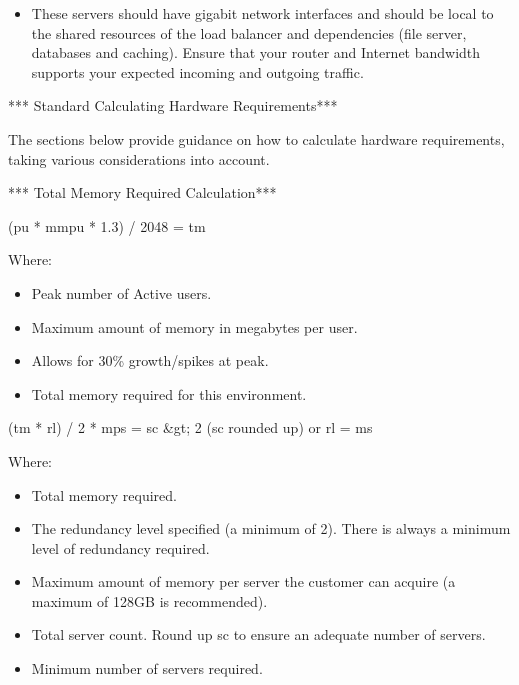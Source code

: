 \documentclass[letterpaper,10pt,english]{sphinxmanual}
\begin{document}
\begin{itemize}
\item {} 
These servers should have gigabit network interfaces and should be local to the shared resources of the load balancer and dependencies (file server, databases and caching). Ensure that your router and Internet bandwidth supports your expected incoming and outgoing traffic.

\end{itemize}

*** Standard Calculating Hardware Requirements***

The sections below provide guidance on how to calculate hardware requirements, taking various considerations into account.

*** Total Memory Required Calculation***

(pu * mmpu * 1.3) / 2048 = tm

Where:
\begin{itemize}
\item {} 
 Peak number of Active users.

\item {} 
 Maximum amount of memory in megabytes per user.

\item {} 
 Allows for 30\% growth/spikes at peak.

\item {} 
 Total memory required for this environment.

\end{itemize}


(tm * rl) / 2 * mps = sc \&gt; 2 (sc rounded up) or rl = ms

Where:
\begin{itemize}
\item {} 
 Total memory required.

\item {} 
 The redundancy level specified (a minimum of 2). There is always a minimum level of redundancy required.

\item {} 
 Maximum amount of memory per server the customer can acquire (a maximum of 128GB is recommended).

\item {} 
 Total server count. Round up sc to ensure an adequate number of servers.

\item {} 
 Minimum number of servers required.

\end{itemize}
\end{document}

